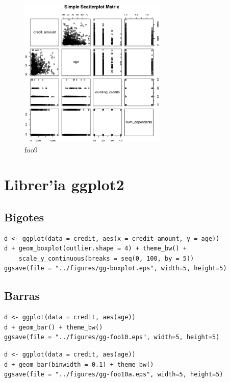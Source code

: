 \begin{figure}[h]
 \centering
 \includegraphics[keepaspectratio,width=7cm]{theimg/foo9}
 \caption[foo9]{foo9}
 \label{fig:puntos5}
\end{figure}


\section{Librer'ia ggplot2}

\subsection{Bigotes}

\begin{verbatim}
d <- ggplot(data = credit, aes(x = credit_amount, y = age)) 
d + geom_boxplot(outlier.shape = 4) + theme_bw() + 
    scale_y_continuous(breaks = seq(0, 100, by = 5))
ggsave(file = "../figures/gg-boxplot.eps", width=5, height=5)
\end{verbatim}

\subsection{Barras}

\begin{verbatim}
d <- ggplot(data = credit, aes(age)) 
d + geom_bar() + theme_bw()
ggsave(file = "../figures/gg-foo10.eps", width=5, height=5)
\end{verbatim}

\begin{verbatim}
d <- ggplot(data = credit, aes(age)) 
d + geom_bar(binwidth = 0.1) + theme_bw()
ggsave(file = "../figures/gg-foo10a.eps", width=5, height=5)
\end{verbatim}

